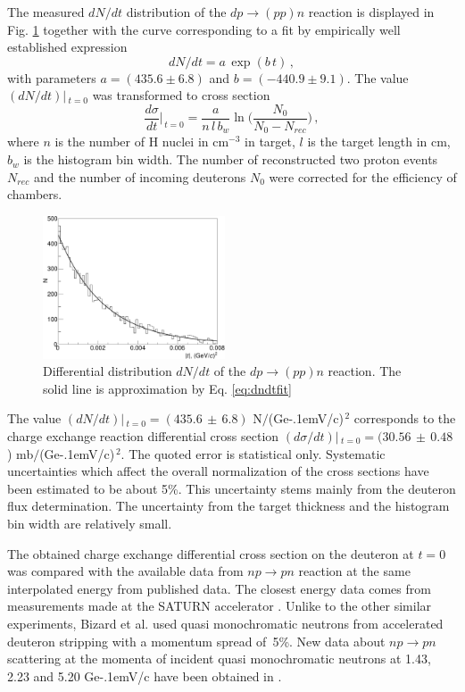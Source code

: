 \documentclass[twocolumn,epjc3]{svjour3}
\newcommand{\np}     {\ensuremath{np \rightarrow pn}\xspace}
\newcommand{\dpchex} {\ensuremath{dp \rightarrow (pp)n}\xspace}
\newcommand{\GeVc}   {Ge\kern-.1emV/c\xspace}
\begin{document}
The measured $dN/dt$ distribution of the \dpchex reaction is displayed in
Fig. \ref{fig:dndt} together with the curve corresponding to a fit by
empirically well established expression
\begin{equation}
  dN/dt = a\,\exp(b\,t)\,,
  \label{eq:dndtfit}
\end{equation}
with parameters $a=(435.6 \pm 6.8)$ and $b=(-440.9 \pm 9.1)$. The value
$(dN/dt)|\,_{t=0}$ was transformed to cross section
\begin{equation}
  \frac{d\sigma}{dt}\Big|_{\,t=0} =
  \frac{a}{n\,l\,b_w}\ln\bigg(\frac{N_0}{N_0-N_{rec}}\bigg)\,,
\end{equation}
where $n$ is the number of H nuclei in cm$^{-3}$ in target, $l$ is the target
length in cm, $b_w$ is the histogram bin width. The number of reconstructed two
proton events $N_{rec}$ and the number of incoming deuterons $N_0$ were
corrected for the efficiency of chambers.

\begin{figure}[h]
  \centering
  \includegraphics[width=0.48\textwidth]{dp_dN.pdf}
  \caption{Differential distribution $dN/dt$ of the \dpchex reaction. The solid
    line is approximation by Eq. \eqref{eq:dndtfit}}
  \label{fig:dndt}
\end{figure}

The value $(dN/dt)|\,_{t=0}=(435.6\,\pm\,6.8)$ N$/$(\GeVc)$^{\,2}$ \linebreak
corresponds to the charge exchange reaction differential \linebreak cross
section $(d\sigma/dt)|\,_{t=0}=(30.56\,\pm\,0.48$) mb$/$(\GeVc)$^{\,2}$. The
quoted error is statistical only. Systematic uncertainties which affect the
overall normalization of the cross sections have been estimated to be about
5\%. This uncertainty stems mainly from the deuteron flux determination. The
uncertainty from the target thickness and the histogram bin width are relatively
small.

The obtained charge exchange differential cross section on the deuteron at $t=0$
was compared with the available data from \np reaction at the same interpolated
energy from published data. The closest energy data comes from measurements made
at the SATURN accelerator \cite{biz75,bys78}. Unlike to the other similar
experiments, Bizard et al. \cite{biz75} used quasi monochromatic neutrons from
accelerated deuteron stripping with a momentum spread of~5\%. New data about \np
scattering at the momenta of incident quasi monochromatic neutrons at 1.43, 2.23
and 5.20 \GeVc have been obtained in \cite{tro14}.
\end{document}
